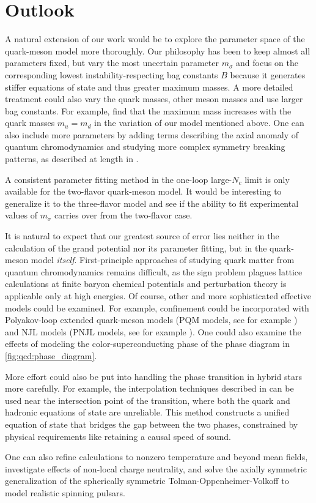 \section{Outlook}

A natural extension of our work would be to
explore the parameter space of the quark-meson model more thoroughly.
Our philosophy has been to keep almost all parameters fixed,
but vary the most uncertain parameter $m_\sigma$ and focus on the corresponding lowest instability-respecting bag constants $B$
because it generates stiffer equations of state and thus greater maximum masses.
A more detailed treatment could also vary the quark masses,
other meson masses and use larger bag constants.
For example, \cite{ref:lsm3f_compact_stars}
find that the maximum mass increases with the quark masses $m_u=m_d$
in the variation of our model mentioned above.
One can also include more parameters by adding terms describing the axial anomaly of quantum chromodynamics
and studying more complex symmetry breaking patterns, as described at length in \cite{ref:lsm3f_details}.

A consistent parameter fitting method in the one-loop large-$N_c$ limit is
only available for the two-flavor quark-meson model.
It would be interesting to generalize it to the three-flavor model
and see if the ability to fit experimental values of $m_\sigma$ carries over from the two-flavor case.

It is natural to expect that our greatest source of error
lies neither in the calculation of the grand potential nor its parameter fitting,
but in the quark-meson model \emph{itself}.
First-principle approaches of studying quark matter from quantum chromodynamics remains difficult,
as the sign problem plagues lattice calculations at finite baryon chemical potentials 
and perturbation theory is applicable only at high energies.
Of course, other and more sophisticated effective models could be examined.
For example, confinement could be incorporated with Polyakov-loop extended quark-meson models (PQM models, see for example \cite{ref:pqm_2f,ref:pqm_3f,ref:master_folkestad}) and NJL models (PNJL models, see for example \cite{ref:pnjl_2f,ref:pnjl_3f,ref:pnjl_3f_zeroT}).
One could also examine the effects of modeling the color-superconducting phase of the phase diagram in \cref{fig:qcd:phase_diagram}.

More effort could also be put into handling the phase transition in hybrid stars more carefully.
For example, the interpolation techniques described in \cite{ref:quark_star_review}
can be used near the intersection point of the transition,
where both the quark and hadronic equations of state are unreliable.
This method constructs a unified equation of state
that bridges the gap between the two phases,
constrained by physical requirements like retaining a causal speed of sound.

One can also refine calculations to nonzero temperature and beyond mean fields,
investigate effects of non-local charge neutrality,
and solve the axially symmetric generalization of the spherically symmetric Tolman-Oppenheimer-Volkoff
to model realistic spinning pulsars.
